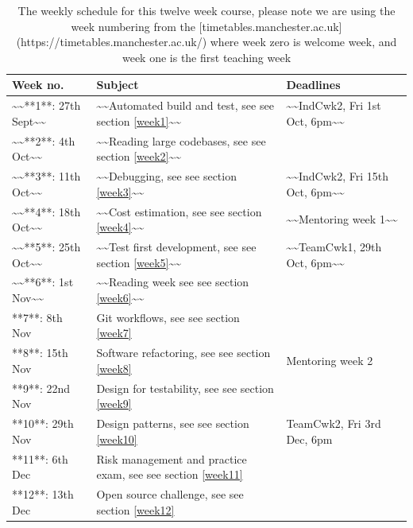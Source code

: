 \documentclass[
]{book}
\begin{document}
\begin{table}

\caption{\label{tab:schedtable}The weekly schedule for this twelve week course, please note we are using the week numbering from the [timetables.manchester.ac.uk](https://timetables.manchester.ac.uk/) where week zero is welcome week, and week one is the first teaching week}
\centering
\begin{tabular}[t]{lll}
\toprule
Week no. & Subject & Deadlines\\
\midrule
\textasciitilde{}\textasciitilde{}**1**: 27th Sept\textasciitilde{}\textasciitilde{} & \textasciitilde{}\textasciitilde{}Automated build and test, see see section \ref{week1}\textasciitilde{}\textasciitilde{} & \textasciitilde{}\textasciitilde{}IndCwk2, Fri 1st Oct, 6pm\textasciitilde{}\textasciitilde{}\\
\textasciitilde{}\textasciitilde{}**2**: 4th Oct\textasciitilde{}\textasciitilde{} & \textasciitilde{}\textasciitilde{}Reading large codebases, see see section \ref{week2}\textasciitilde{}\textasciitilde{} & \\
\textasciitilde{}\textasciitilde{}**3**: 11th Oct\textasciitilde{}\textasciitilde{} & \textasciitilde{}\textasciitilde{}Debugging, see see section \ref{week3}\textasciitilde{}\textasciitilde{} & \textasciitilde{}\textasciitilde{}IndCwk2, Fri 15th Oct, 6pm\textasciitilde{}\textasciitilde{}\\
\textasciitilde{}\textasciitilde{}**4**: 18th Oct\textasciitilde{}\textasciitilde{} & \textasciitilde{}\textasciitilde{}Cost estimation, see see section \ref{week4}\textasciitilde{}\textasciitilde{} & \textasciitilde{}\textasciitilde{}Mentoring week 1\textasciitilde{}\textasciitilde{}\\
\textasciitilde{}\textasciitilde{}**5**: 25th Oct\textasciitilde{}\textasciitilde{} & \textasciitilde{}\textasciitilde{}Test first development, see see section \ref{week5}\textasciitilde{}\textasciitilde{} & \textasciitilde{}\textasciitilde{}TeamCwk1, 29th Oct, 6pm\textasciitilde{}\textasciitilde{}\\
\addlinespace
\textasciitilde{}\textasciitilde{}**6**: 1st Nov\textasciitilde{}\textasciitilde{} & \textasciitilde{}\textasciitilde{}Reading week see see section \ref{week6}\textasciitilde{}\textasciitilde{} & \\
**7**: 8th Nov & Git workflows, see see section \ref{week7} & \\
**8**: 15th Nov & Software refactoring, see see section \ref{week8} & Mentoring week 2\\
**9**: 22nd Nov & Design for testability, see see section \ref{week9} & \\
**10**: 29th Nov & Design patterns, see see section \ref{week10} & TeamCwk2, Fri 3rd Dec, 6pm\\
\addlinespace
**11**: 6th Dec & Risk management and practice exam, see see section \ref{week11} & \\
**12**: 13th Dec & Open source challenge, see see section \ref{week12} & \\
\bottomrule
\end{tabular}
\end{table}
\end{document}
